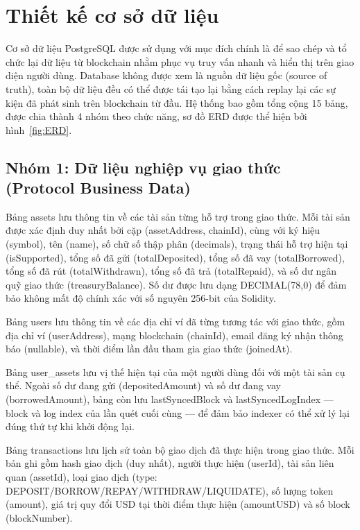 \documentclass[../DoAn.tex]{subfiles}
\begin{document}
\section{Thiết kế cơ sở dữ liệu}


Cơ sở dữ liệu PostgreSQL được sử dụng với mục đích chính là để sao chép và tổ chức lại dữ liệu từ blockchain nhằm phục vụ truy vấn nhanh và hiển thị trên giao diện người dùng. Database không được xem là nguồn dữ liệu gốc (source of truth), toàn bộ dữ liệu đều có thể được tái tạo lại bằng cách replay lại các sự kiện đã phát sinh trên blockchain từ đầu. Hệ thống bao gồm tổng cộng 15 bảng, được chia thành 4 nhóm theo chức năng, sơ đồ ERD được thể hiện bởi hình~\ref{fig:ERD}.

\subsection{Nhóm 1: Dữ liệu nghiệp vụ giao thức (Protocol Business Data)}


Bảng assets lưu thông tin về các tài sản từng hỗ trợ trong giao thức. Mỗi tài sản được xác định duy nhất bởi cặp (assetAddress, chainId), cùng với ký hiệu (symbol), tên (name), số chữ số thập phân (decimals), trạng thái hỗ trợ hiện tại (isSupported), tổng số đã gửi (totalDeposited), tổng số đã vay (totalBorrowed), tổng số đã rút (totalWithdrawn), tổng số đã trả (totalRepaid), và số dư ngân quỹ giao thức (treasuryBalance). Số dư được lưu dạng DECIMAL(78,0) để đảm bảo không mất độ chính xác với số nguyên 256-bit của Solidity.

Bảng users lưu thông tin về các địa chỉ ví đã từng tương tác với giao thức, gồm địa chỉ ví (userAddress), mạng blockchain (chainId), email đăng ký nhận thông báo (nullable), và thời điểm lần đầu tham gia giao thức (joinedAt).

Bảng user\_assets lưu vị thế hiện tại của một người dùng đối với một tài sản cụ thể. Ngoài số dư đang gửi (depositedAmount) và số dư đang vay (borrowedAmount), bảng còn lưu lastSyncedBlock và lastSyncedLogIndex --- block và log index của lần quét cuối cùng --- để đảm bảo indexer có thể xử lý lại đúng thứ tự khi khởi động lại.

Bảng transactions lưu lịch sử toàn bộ giao dịch đã thực hiện trong giao thức. Mỗi bản ghi gồm hash giao dịch (duy nhất), người thực hiện (userId), tài sản liên quan (assetId), loại giao dịch (type: DEPOSIT/BORROW/REPAY/WITHDRAW/LIQUIDATE), số lượng token (amount), giá trị quy đổi USD tại thời điểm thực hiện (amountUSD) và số block (blockNumber).
\end{document}
